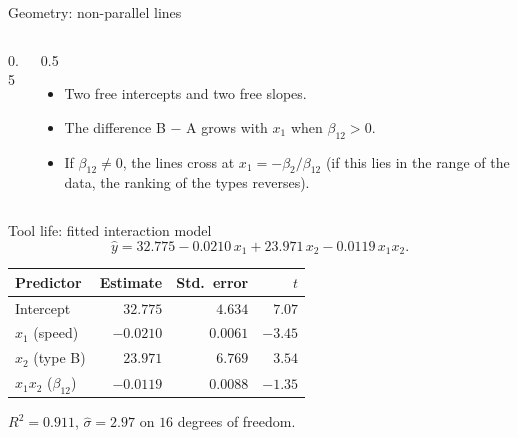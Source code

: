 \begin{frame}{Geometry: non-parallel lines}
    \begin{columns}[T]
        \begin{column}{0.5\textwidth}
            \begin{center}
            \end{center}
        \end{column}
        \begin{column}{0.5\textwidth}
            \begin{itemize}
                \item Two free intercepts and two free slopes.
                \item The difference B $-$ A grows with $x_1$ when $\beta_{12} > 0$.
                \item If $\beta_{12} \ne 0$, the lines cross at $x_1 = -\beta_2 / \beta_{12}$ (if this lies in the range of the data, the ranking of the types reverses).
            \end{itemize}
        \end{column}
    \end{columns}
\end{frame}


\begin{frame}{Tool life: fitted interaction model}
    \[
        \hat{y} = 32.775 - 0.0210\, x_1 + 23.971\, x_2 - 0.0119\, x_1 x_2 .
    \]
    \centering
    \small
    \begin{tabular}{lrrr}
        \toprule
        Predictor & Estimate & Std.\ error & $t$ \\
        \midrule
        Intercept & $32.775$ & $4.634$ & $7.07$ \\
        $x_1$ (speed) & $-0.0210$ & $0.0061$ & $-3.45$ \\
        $x_2$ (type B) & $23.971$ & $6.769$ & $3.54$ \\
        $x_1 x_2$ ($\beta_{12}$) & $-0.0119$ & $0.0088$ & $-1.35$ \\
        \bottomrule
    \end{tabular}

    \vspace{0.8em}
    \raggedright
    $R^2 = 0.911$, \quad $\hat{\sigma} = 2.97$ on $16$ degrees of freedom.
\end{frame}


